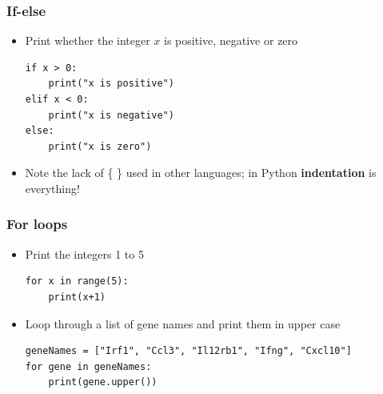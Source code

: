 \documentclass[pdf]{beamer}
\begin{document}
\begin{frame}[fragile]
\frametitle{If-else}

\begin{itemize}
	\item Print whether the integer $x$ is positive, negative or zero

\begin{lstlisting}[style=python]
if x > 0:
    print("x is positive")
elif x < 0:
    print("x is negative")
else:
    print("x is zero")
\end{lstlisting}

	\item Note the lack of \{ \} used in other languages; in Python \textbf{indentation} is everything!
\end{itemize}

\end{frame}

\begin{frame}[fragile]
\frametitle{For loops}

\begin{itemize}

\item<1-> Print the integers 1 to 5
\begin{lstlisting}[style=python]
for x in range(5):
    print(x+1)
\end{lstlisting}

\item<2-> Loop through a list of gene names and print them in upper case
\begin{lstlisting}[style=python]
geneNames = ["Irf1", "Ccl3", "Il12rb1", "Ifng", "Cxcl10"]
for gene in geneNames:
    print(gene.upper())
\end{lstlisting}

\end{itemize}

\end{frame}
\end{document}
